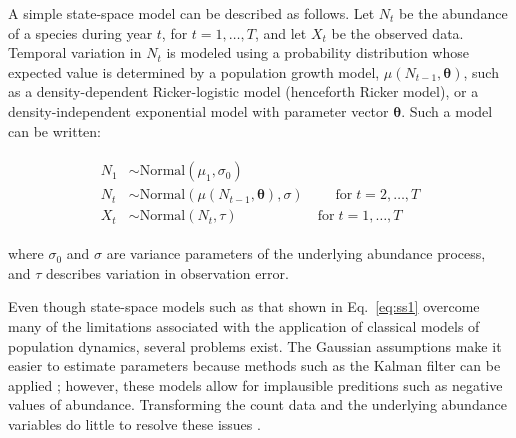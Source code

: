\documentclass[12pt,english]{article}
\begin{document}
\begin{spacing}{1.9}
\begin{flushleft}
A simple state-space model can be described as follows.
Let $N_t$ be the abundance of a species during year $t$, for
$t=1,\hdots,T$, and let $X_t$ be the observed data. 
Temporal variation in $N_t$ is
modeled using a probability distribution whose expected value is
determined by a population growth model, $\mu(N_{t-1}, {\bm \theta})$, such as 
a density-dependent Ricker-logistic model (henceforth Ricker model), or  
a density-independent exponential model with parameter vector $\bm
\theta$. Such a model can be written:  
\begin{linenomath*}
\begin{gather}
  \label{eq:ss1}
  \begin{align}
  N_1 &\sim \mathrm{Normal}(\mu_1, \sigma_0) \nonumber \\
  N_t &\sim \mathrm{Normal}(\mu(N_{t-1}, {\bm \theta}), \sigma) \qquad
  \; \text{for} \;  t=2,\hdots,T  \\
  X_t &\sim \mathrm{Normal}(N_t, \tau) \qquad \qquad \quad \;\;\, \text{for} \;  t=1,\hdots,T  \nonumber
  \end{align}
\end{gather}
\end{linenomath*}
where $\sigma_0$ and $\sigma$ are variance parameters of the
underlying abundance process, and $\tau$ describes variation in 
observation error. 

Even though state-space models such as that shown in Eq.~\ref{eq:ss1}
overcome many of the limitations associated with the application of
classical models of population dynamics, several problems exist. 
The Gaussian assumptions 
make it easier to estimate parameters because methods such as the Kalman
filter can be applied \citep{dennis_etal:2006}; however, 
these models allow for implausible preditions such as 
negative values of abundance. 
Transforming the count data and the underlying abundance variables 
do little to resolve these issues \citep{ohara_kotze:2010}.


\end{flushleft}
\end{spacing}
\end{document}
